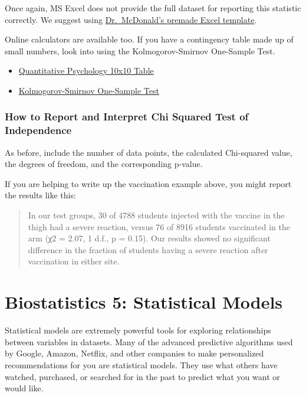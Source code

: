 \documentclass[
]{book}
\providecommand{\tightlist}{%
  \setlength{\itemsep}{0pt}\setlength{\parskip}{0pt}}
\begin{document}
Once again, MS Excel does not provide the full dataset for reporting this statistic correctly. We suggest using \href{http://www.biostathandbook.com/chiind.xls}{Dr.~McDonald's premade Excel template}.

Online calculators are available too. If you have a contingency table made up of small numbers, look into using the Kolmogorov-Smirnov One-Sample Test.

\begin{itemize}
\tightlist
\item
  \href{http://www.quantpsy.org/chisq/chisq.htm}{Quantitative Psychology 10x10 Table}
\item
  \href{http://vassarstats.net/ksm.html}{Kolmogorov-Smirnov One-Sample Test}
\end{itemize}

\hypertarget{how-to-report-and-interpret-chi-squared-test-of-independence}{%
\subsection{How to Report and Interpret Chi Squared Test of Independence}\label{how-to-report-and-interpret-chi-squared-test-of-independence}}

As before, include the number of data points, the calculated Chi-squared value, the degrees of freedom, and the corresponding p-value.

If you are helping to write up the vaccination example above, you might report the results like this:

\begin{quote}
In our test groups, 30 of 4788 students injected with the vaccine in the thigh had a severe reaction, versus 76 of 8916 students vaccinated in the arm (χ2 = 2.07, 1 d.f., p = 0.15). Our results showed no significant difference in the fraction of students having a severe reaction after vaccination in either site.
\end{quote}

\hypertarget{models480}{%
\chapter{Biostatistics 5: Statistical Models}\label{models480}}

Statistical models are extremely powerful tools for exploring relationships between variables in datasets. Many of the advanced predictive algorithms used by Google, Amazon, Netflix, and other companies to make personalized recommendations for you are statistical models. They use what others have watched, purchased, or searched for in the past to predict what you want or would like.
\end{document}

